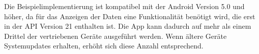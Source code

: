 Die Beispielimplementierung ist kompatibel mit der Android Version 5.0 und höher, da für das Anzeigen der Daten eine Funktionalität benötigt wird, die erst in der API Version 21 enthalten ist. Die App kann dadurch auf mehr als einem Drittel der vertriebenen Geräte ausgeführt werden. Wenn ältere Geräte Systemupdates erhalten, erhöht sich diese Anzahl entsprechend. 

	
	
